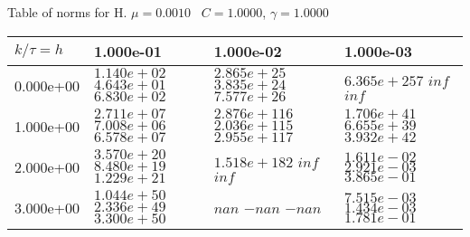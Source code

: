 \begin{center}
Table of norms for H. $\mu = 0.0010$ \, $C = 1.0000$, $\gamma = 1.0000$
  
\begin{tabular}{|p{1in}|p{1in}|p{1in}|p{1in}|} \hline
$k / \tau = h$ &1.000e-01 &1.000e-02 &1.000e-03 \\ \hline 
0.000e+00 & $1.140e+02$  $4.643e+01$  $6.830e+02$  & $2.865e+25$  $3.835e+24$  $7.577e+26$  & $6.365e+257$  $inf$  $inf$  \\ \hline 
1.000e+00 & $2.711e+07$  $7.008e+06$  $6.578e+07$  & $2.876e+116$  $2.036e+115$  $2.955e+117$  & $1.706e+41$  $6.655e+39$  $3.932e+42$  \\ \hline 
2.000e+00 & $3.570e+20$  $8.480e+19$  $1.229e+21$  & $1.518e+182$  $inf$  $inf$  & $1.611e-02$  $2.921e-03$  $3.865e-01$  \\ \hline 
3.000e+00 & $1.044e+50$  $2.336e+49$  $3.300e+50$  & $nan$  $-nan$  $-nan$  & $7.515e-03$  $1.434e-03$  $1.781e-01$  \\ \hline 

\end{tabular}\\[20pt]
\end{center}
